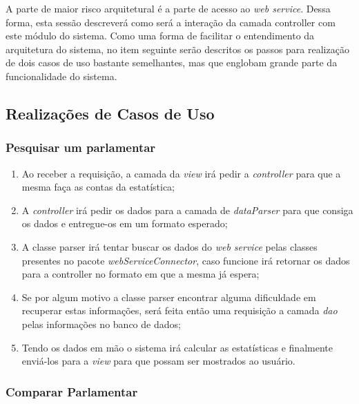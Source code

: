 A parte de maior risco arquitetural é a parte de acesso ao \textit{web service}. Dessa forma, esta sessão descreverá como será a interação da camada controller com este módulo do sistema. Como uma forma de facilitar o entendimento da arquitetura do sistema, no item seguinte serão descritos os passos para realização de dois casos de uso bastante semelhantes, mas que englobam grande parte da funcionalidade do sistema.

\subsection{Realizações de Casos de Uso}
	
	\subsubsection{Pesquisar um parlamentar}

		\begin{enumerate}
			\item Ao receber a requisição, a camada da \textit{view} irá pedir a \textit{controller} para que a mesma faça as contas da estatística;

			\item A \textit{controller} irá pedir os dados para a camada de \textit{dataParser} para que consiga os dados e entregue-os em um formato esperado;

			\item A classe parser irá tentar buscar os dados do \textit{web service} pelas classes presentes no pacote \textit{webServiceConnector}, caso funcione irá retornar os dados para a controller no formato em que a mesma já espera;

			\item Se por algum motivo a classe parser encontrar alguma dificuldade em recuperar estas informações, será feita então uma requisição a camada \textit{dao} pelas informações no banco de dados;

			\item Tendo os dados em mão o sistema irá calcular as estatísticas e finalmente enviá-los para a \textit{view} para que possam ser mostrados ao usuário.
		\end{enumerate}

	\subsubsection{Comparar Parlamentar}


